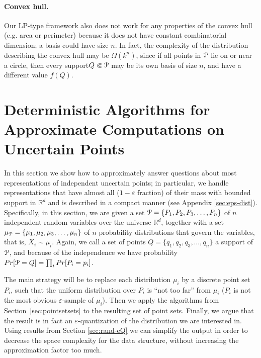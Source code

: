 \documentclass{journal}
\newcommand{\eps}{\varepsilon}
\newcommand{\Eu}[1]{\ensuremath{\EuScript{#1}}}
\renewcommand{\b}[1]{\ensuremath{\mathbb{#1}}}
\newcommand{\R}{\ensuremath{\mathbb{R}}}
\newcommand{\pset}{support\xspace}
\begin{document}
\paragraph{Convex hull.}
Our LP-type framework also does not work for any properties of the convex hull (e.g. area or perimeter) because it does not have constant combinatorial dimension; a basis could have size $n$.   In fact, the complexity of the distribution describing the convex hull may be $\Omega(k^n)$, since if all points in $\Eu P$ lie on or near a circle, then every \pset $Q \Subset \Eu P$ may be its own basis of size $n$, and have a different value $f(Q)$.  



































\section {Deterministic Algorithms for Approximate Computations on Uncertain Points}
\label {sec:distributions}

In this section we show how to approximately answer questions about most representations of independent uncertain points; in particular, we handle representations that have almost all ($1-\eps$ fraction) of their mass with bounded support in $\b{R}^d$ and is described in a compact manner (see Appendix \ref{sec:eps-dist}).  
Specifically, in this section, we are given a set $\Eu P = \{P_1, P_2, P_3, \ldots, P_n\}$ of $n$ independent random variables over the universe $\R^d$, together with a set $\Eu \mu_{\Eu{P}} = \{\mu_1, \mu_2, \mu_3, \ldots, \mu_n\}$ of $n$ probability distributions that govern the variables, that is, $X_i \sim \mu_i$.
Again, we call a set of points $Q = \{q_1, q_2, q_3, \ldots, q_n\}$ a \pset of $\Eu P$, and because of the independence we have probability $Pr[\Eu P = Q] = \prod_{i} Pr[P_i = p_i]$.

    The main strategy will be to replace each distribution $\mu_i$ by a discrete point set $P_i$, such that the uniform distribution over $P_i$ is ``not too far'' from $\mu_i$ ($P_i$ is not the most obvious $\eps$-sample of $\mu_i$). Then we apply the algorithms from Section~\ref {sec:pointsetsets} to the resulting set of point sets. Finally, we argue that the result is in fact an $\eps$-quantization of the distribution we are interested in.   Using results from Section \ref{sec:rand-eQ} we can simplify the output in order to decrease the space complexity for the data structure, without increasing the approximation factor too much.
\end{document}

